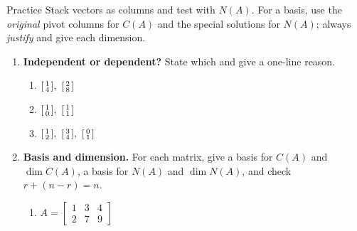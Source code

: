 \documentclass[10pt]{article}
\begin{document}
\namedateperiod

\vspace{0.12in}

\begin{notesbox}{Practice}
Stack vectors as columns and test with $N(A)$. For a basis, use the \emph{original} pivot columns for
$C(A)$ and the special solutions for $N(A)$; always \emph{justify} and give each dimension.

\begin{enumerate}[leftmargin=1.9em, itemsep=11pt]
  \item \textbf{Independent or dependent?} State which and give a one-line reason.
    \begin{enumerate}[label=(\alph*), leftmargin=1.8em, itemsep=5pt]
      \item $\begin{bsmallmatrix} 1\\4 \end{bsmallmatrix},\ \begin{bsmallmatrix} 2\\8 \end{bsmallmatrix}$ \hfill
      \item $\begin{bsmallmatrix} 1\\0 \end{bsmallmatrix},\ \begin{bsmallmatrix} 1\\1 \end{bsmallmatrix}$ \hfill
      \item $\begin{bsmallmatrix} 1\\2 \end{bsmallmatrix},\ \begin{bsmallmatrix} 3\\4 \end{bsmallmatrix},\ \begin{bsmallmatrix} 0\\1 \end{bsmallmatrix}$ \hfill
    \end{enumerate}
    \vspace{0.9cm}
  \item \textbf{Basis and dimension.} For each matrix, give a basis for $C(A)$ and $\dim C(A)$, a basis for
        $N(A)$ and $\dim N(A)$, and check $r+(n-r)=n$.
    \begin{enumerate}[label=(\alph*), leftmargin=1.8em, itemsep=6pt]
      \item $A=\begin{bmatrix} 1 & 3 & 4 \\ 2 & 7 & 9 \end{bmatrix}$ \vspace{1.1cm}

\end{enumerate}
\end{enumerate}
\end{notesbox}
\end{document}
